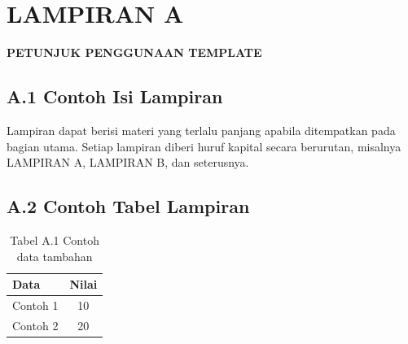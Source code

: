 \clearpage
{}
\pagestyle{empty}
{}
\chapter*{LAMPIRAN A}
\begin{center}
  \textbf{PETUNJUK PENGGUNAAN TEMPLATE}
\end{center}


\section*{A.1 Contoh Isi Lampiran}

Lampiran dapat berisi materi yang terlalu panjang apabila ditempatkan pada bagian utama. Setiap lampiran diberi huruf kapital secara berurutan, misalnya LAMPIRAN A, LAMPIRAN B, dan seterusnya.

\section*{A.2 Contoh Tabel Lampiran}

\begin{table}[H]
  \centering
  \caption*{Tabel A.1 Contoh data tambahan}
  \begin{tabular}{lc}
    \toprule
    \textbf{Data} & \textbf{Nilai} \\
    \midrule
    Contoh 1 & 10 \\
    Contoh 2 & 20 \\
    \bottomrule
  \end{tabular}
\end{table}
